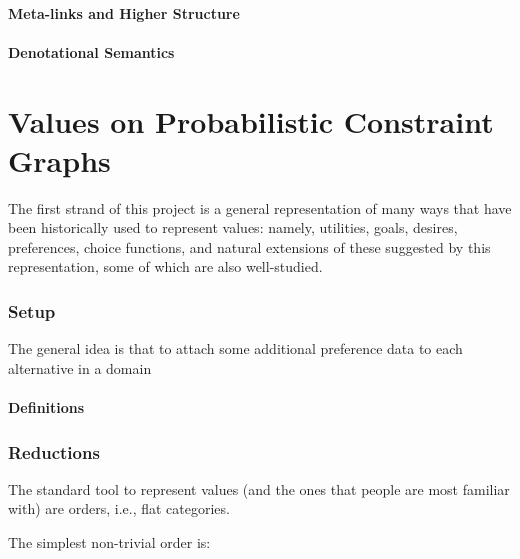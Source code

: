 \documentclass{article}
\begin{document}
	\subsection{Meta-links and Higher Structure}
	\subsection{Denotational Semantics}
	
	\part{Values on Probabilistic Constraint Graphs}
	
	The first strand of this project is a general representation of many ways that have been historically used to represent values: namely, utilities, goals, desires, preferences, choice functions, and natural extensions of these suggested by this representation, some of which are also well-studied. 
	
	\section{Setup}
	
	
	The general idea is that to attach some additional preference data to each alternative in a domain
	
	\subsection{Definitions}
	

	
	\section{Reductions}
	
	The standard tool to represent values (and the ones that people are most familiar with) are orders, i.e., flat categories. 
	
	The simplest non-trivial order is:
	\begin{center}
		\raisebox{0.7em}{$\mathbb B = $}~
	\end{center}
	
\end{document}
